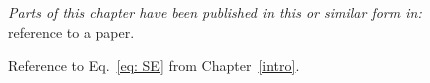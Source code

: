 {\raggedleft \textit{Parts of this chapter have been published in this or similar form in:} \\
reference to a paper.\\}

\hrulefill 

Reference to Eq.~\eqref{eq: SE} from Chapter~\ref{intro}.